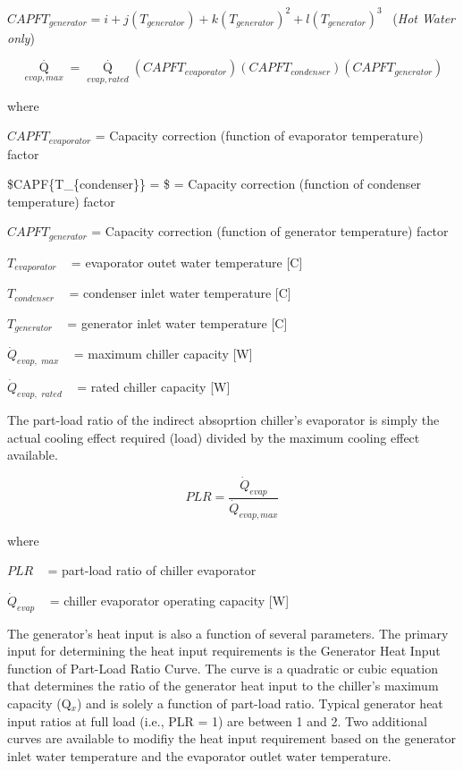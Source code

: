 \(CAPF{T_{generator}} = i + j\left( {{T_{generator}}} \right) + k{\left( {{T_{generator}}} \right)^2} + l{\left( {{T_{generator}}} \right)^3}\) ~(\emph{Hot Water only})

\begin{equation}
{\mathop Q\limits^\cdot_{evap,max}} = {\mathop Q\limits^\cdot_{evap,rated}}\left( {CAPF{T_{evaporator}}} \right)\left( {CAPF{T_{condenser}}} \right)\left( {CAPF{T_{generator}}} \right)
\end{equation}

where

\(CAPF{T_{evaporator}}\) = Capacity correction (function of evaporator temperature) factor

\$CAPF\{T\_\{condenser\}\} = \$ = Capacity correction (function of condenser temperature) factor

\(CAPF{T_{generator}}\) = Capacity correction (function of generator temperature) factor

\({T_{evaporator}}\) ~ = evaporator outet water temperature {[}C{]}

\({T_{condenser}}\) ~ = condenser inlet water temperature {[}C{]}

\({T_{generator}}\) ~ = generator inlet water temperature {[}C{]}

\({\dot Q_{evap,\,\,max}}\) ~ = maximum chiller capacity {[}W{]}

\({\dot Q_{evap,\,\,rated}}\) ~ = rated chiller capacity {[}W{]}

The part-load ratio of the indirect absoprtion chiller's evaporator is simply the actual cooling effect required (load) divided by the maximum cooling effect available.

\begin{equation}
  PLR = \frac{\dot{Q}_{evap}}{\dot{Q}_{evap,max}}
\end{equation}

where

\(PLR\) ~ = part-load ratio of chiller evaporator

\({\dot Q_{evap}}\) ~ = chiller evaporator operating capacity {[}W{]}

The generator's heat input is also a function of several parameters. The primary input for determining the heat input requirements is the Generator Heat Input function of Part-Load Ratio Curve. The curve is a quadratic or cubic equation that determines the ratio of the generator heat input to the chiller's maximum capacity (Q\(_{x}\)) and is solely a function of part-load ratio. Typical generator heat input ratios at full load (i.e., PLR = 1) are between 1 and 2. Two additional curves are available to modifiy the heat input requirement based on the generator inlet water temperature and the evaporator outlet water temperature.

